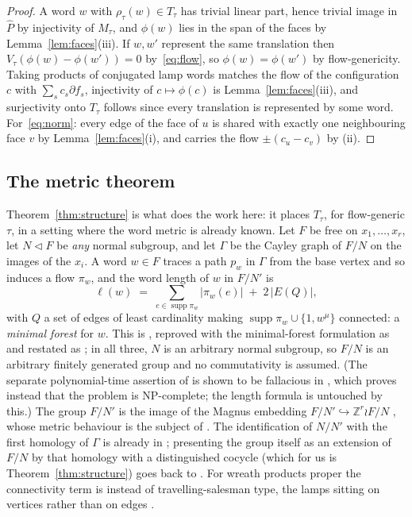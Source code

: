 \documentclass[11pt]{article}
\theoremstyle{definition}
\theoremstyle{remark}
\newcommand{\Z}{\mathbb{Z}}
\begin{document}
\begin{proof}
A word $w$ with $\rho_\tau(w)\in T_\tau$ has trivial linear part, hence
trivial image in $\widehat P$ by injectivity of $M_\tau$, and $\phi(w)$ lies
in the span of the faces by Lemma~\ref{lem:faces}(iii). If $w,w'$ represent
the same translation then $V_\tau(\phi(w)-\phi(w'))=0$ by~\eqref{eq:flow},
so $\phi(w)=\phi(w')$ by flow-genericity. Taking products of conjugated lamp
words matches the flow of the configuration $c$ with $\sum_s c_s\partial
f_s$, injectivity of $c\mapsto\phi(c)$ is Lemma~\ref{lem:faces}(iii), and
surjectivity onto $T_\tau$ follows since every translation is represented by
some word. For~\eqref{eq:norm}: every edge of the face of $u$ is shared with
exactly one neighbouring face $v$ by Lemma~\ref{lem:faces}(i), and carries
the flow $\pm(c_u-c_v)$ by (ii).
\end{proof}

\subsection{The metric theorem}

Theorem~\ref{thm:structure} is what does the work here: it places $T_\tau$, for
flow-generic $\tau$, in a setting where the word metric is already known. Let
$F$ be free on $x_1,\dots,x_r$, let $N\vartriangleleft F$ be \emph{any} normal
subgroup, and let $\Gamma$ be the Cayley graph of $F/N$ on the images of the
$x_i$. A word $w\in F$ traces a path $p_w$ in $\Gamma$ from the base vertex and
so induces a flow $\pi_w$, and the word length of $w$ in $F/N'$ is
\[
 \ell(w)\;=\;\sum_{e\in\operatorname{supp}\pi_w}|\pi_w(e)|\;+\;2\,|E(Q)|,
\]
with $Q$ a set of edges of least cardinality making
$\operatorname{supp}\pi_w\cup\{1,w^\mu\}$ connected: a \emph{minimal forest}
for $w$. This is \cite[Thm.~2]{DLS}, reproved with the minimal-forest
formulation as \cite[Thm.~2.10, with eqs.~(6),(7)]{MRUV} and restated as
\cite[Lem.~3.2]{Sale}; in all three, $N$ is an arbitrary normal subgroup, so
$F/N$ is an arbitrary finitely generated group and no commutativity is assumed.
(The separate polynomial-time assertion of \cite[Thm.~1]{DLS} is shown to be
fallacious in \cite[\S4]{MRUV}, which proves instead that the problem is
NP-complete; the length formula is untouched by this.) The group $F/N'$ is the
image of the Magnus embedding $F/N'\hookrightarrow\Z^r\wr F/N$ \cite{Magnus},
whose metric behaviour is the subject of \cite{Sale,Vassileva}. The
identification of $N/N'$ with the first homology of $\Gamma$ is already in
\cite{DLS}; presenting the group itself as an extension of $F/N$ by that
homology with a distinguished cocycle (which for us is
Theorem~\ref{thm:structure}) goes back to \cite{VD}. For wreath products proper the connectivity
term is instead of travelling-salesman type, the lamps sitting on vertices
rather than on edges \cite{Parry}.
\end{document}
